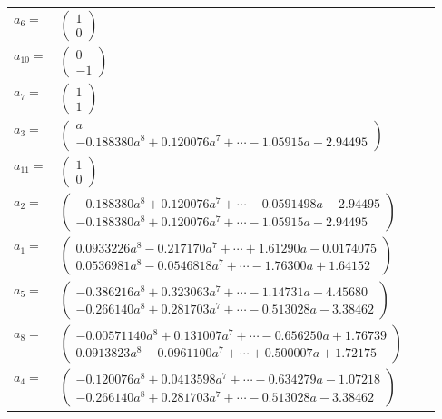 \documentclass[1p]{elsarticle_modified}
\theoremstyle{definition}
\begin{document}
\begin{tabular}{m{7pt} m{180pt} m{7pt} m{180pt} }
\flushright $a_{6}=$&$\begin{pmatrix}1\\0\end{pmatrix}$ \\
\flushright $a_{10}=$&$\begin{pmatrix}0\\-1\end{pmatrix}$ \\
\flushright $a_{7}=$&$\begin{pmatrix}1\\1\end{pmatrix}$ \\
\flushright $a_{3}=$&$\begin{pmatrix}a\\-0.188380 a^{8}+0.120076 a^{7}+\cdots-1.05915 a-2.94495\end{pmatrix}$ \\
\flushright $a_{11}=$&$\begin{pmatrix}1\\0\end{pmatrix}$ \\
\flushright $a_{2}=$&$\begin{pmatrix}-0.188380 a^{8}+0.120076 a^{7}+\cdots-0.0591498 a-2.94495\\-0.188380 a^{8}+0.120076 a^{7}+\cdots-1.05915 a-2.94495\end{pmatrix}$ \\
\flushright $a_{1}=$&$\begin{pmatrix}0.0933226 a^{8}-0.217170 a^{7}+\cdots+1.61290 a-0.0174075\\0.0536981 a^{8}-0.0546818 a^{7}+\cdots-1.76300 a+1.64152\end{pmatrix}$ \\
\flushright $a_{5}=$&$\begin{pmatrix}-0.386216 a^{8}+0.323063 a^{7}+\cdots-1.14731 a-4.45680\\-0.266140 a^{8}+0.281703 a^{7}+\cdots-0.513028 a-3.38462\end{pmatrix}$ \\
\flushright $a_{8}=$&$\begin{pmatrix}-0.00571140 a^{8}+0.131007 a^{7}+\cdots-0.656250 a+1.76739\\0.0913823 a^{8}-0.0961100 a^{7}+\cdots+0.500007 a+1.72175\end{pmatrix}$ \\
\flushright $a_{4}=$&$\begin{pmatrix}-0.120076 a^{8}+0.0413598 a^{7}+\cdots-0.634279 a-1.07218\\-0.266140 a^{8}+0.281703 a^{7}+\cdots-0.513028 a-3.38462\end{pmatrix}$ \\

\end{tabular}
\end{document}
